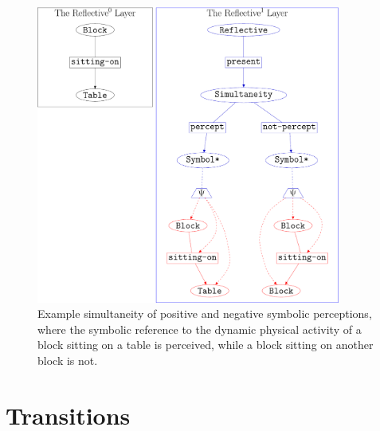 \begin{figure}
\center
\includegraphics[width=10cm]{gfx/example_simultaneity}
\caption[Example simultaneity of positive and negative symbolic
  perceptions.]{Example simultaneity of positive and negative symbolic
  perceptions, where the symbolic reference to the dynamic physical
  activity of a block sitting on a table is perceived, while a block
  sitting on another block is not.}
\label{figure:example_simultaneity}
\end{figure}

\section{Transitions}

